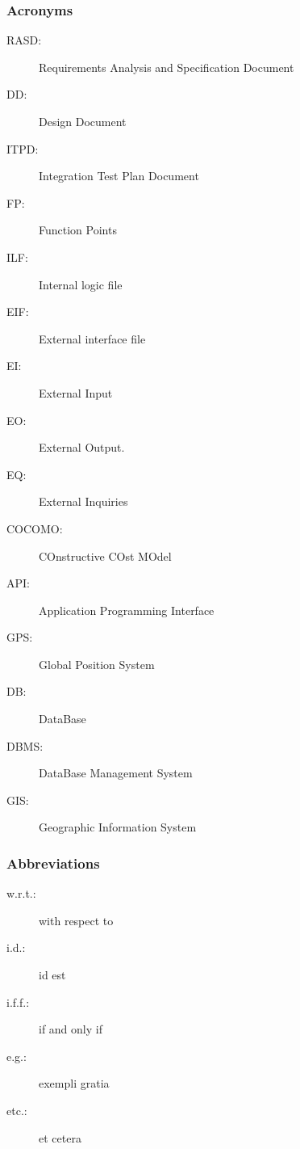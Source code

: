 \subsubsection{Acronyms}
	\begin{description}
		\item [RASD:] Requirements Analysis and Specification Document
		\item [DD:] Design Document
		\item [ITPD:] Integration Test Plan Document
		\item [FP:] Function Points
		\item [ILF:] Internal logic file
		\item [EIF:] External interface file
		\item [EI:] External Input
		\item [EO:] External Output.
		\item [EQ:] External Inquiries
		\item [COCOMO:] COnstructive COst MOdel
		\item [API:] Application Programming Interface
		\item [GPS:] Global Position System
		\item [DB:] DataBase
		\item [DBMS:] DataBase Management System
		\item [GIS:] Geographic Information System
	\end{description}
\subsubsection{Abbreviations}
	\begin{description}
		\item [w.r.t.:] with respect to
		\item [i.d.:] id est
		\item [i.f.f.:] if and only if
		\item [e.g.:] exempli gratia
		\item [etc.:] et cetera
	\end{description}

